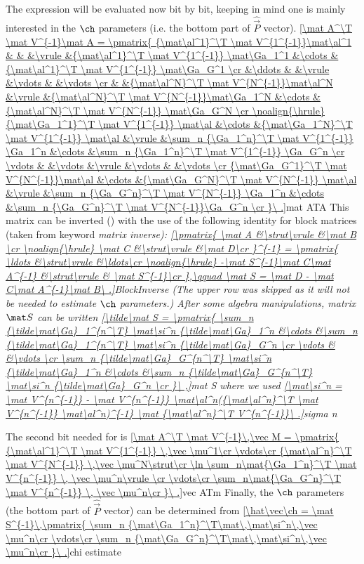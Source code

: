 The \rhs expression will be evaluated now bit by bit, keeping in mind one is mainly interested in the $\ch$ parameters (i.e. the bottom part of $\hat\vec P$ vector).
\eqref{\mat A^\T \mat V^{-1}\mat A = \pmatrix{
{\mat\al^1}^\T \mat V^{1^{-1}}\mat\al^1	&		&						&\vrule	&{\mat\al^1}^\T \mat V^{1^{-1}} \mat\Ga_1^1	&\cdots	&{\mat\al^1}^\T \mat V^{1^{-1}} \mat\Ga_G^1	\cr
					&\ddots	&						&\vrule	&\vdots					&		&\vdots					\cr
					&		&{\mat\al^N}^\T \mat V^{N^{-1}}\mat\al^N		&\vrule	&{\mat\al^N}^\T \mat V^{N^{-1}}\mat\Ga_1^N	&\cdots	&{\mat\al^N}^\T \mat V^{N^{-1}} \mat\Ga_G^N	\cr
\noalign{\hrule}
{\mat\Ga_1^1}^\T \mat V^{1^{-1}} \mat\al	&\cdots	&{\mat\Ga_1^N}^\T \mat V^{1^{-1}} \mat\al	&\vrule	&\sum_n {\Ga_1^n}^\T \mat V^{1^{-1}} \Ga_1^n	&\cdots	&\sum_n {\Ga_1^n}^\T \mat V^{1^{-1}} \Ga_G^n	\cr
\vdots				&		&\vdots					&\vrule	&\vdots					&		&\vdots					\cr
{\mat\Ga_G^1}^\T \mat V^{N^{-1}}\mat\al	&\cdots	&{\mat\Ga_G^N}^\T \mat V^{N^{-1}} \mat\al	&\vrule	&\sum_n {\Ga_G^n}^\T \mat V^{N^{-1}} \Ga_1^n	&\cdots	&\sum_n {\Ga_G^n}^\T \mat V^{N^{-1}}\Ga_G^n	\cr
}\ .}{mat ATA}
This matrix can be inverted () with the use of the following identity for block matrices (taken from  keyword \em{matrix inverse}): 
\eqref{\pmatrix{
\mat A	&\strut\vrule	&\mat B	\cr
\noalign{\hrule}
\mat C	&\strut\vrule	&\mat D\cr
}^{-1} = \pmatrix{
\ldots							&\strut\vrule	&\ldots\cr
\noalign{\hrule}
-\mat S^{-1}\mat C\mat A^{-1}	&\strut\vrule	& \mat S^{-1}\cr
},\qquad \mat S = \mat D - \mat C\mat A^{-1}\mat B\ .}{BlockInverse}
(The upper row was skipped as it will not be needed to estimate $\ch$ parameters.) After some algebra manipulations, matrix $\mat S$ can be written
\eqref{\tilde\mat S = \pmatrix{
\sum_n {\tilde\mat\Ga}_1^{n^\T} \mat\si^n {\tilde\mat\Ga}_1^n	&\cdots	&\sum_n {\tilde\mat\Ga}_1^{n^\T} \mat\si^n {\tilde\mat\Ga}_G^n	\cr
\vdots								&		&\vdots									\cr
\sum_n {\tilde\mat\Ga}_G^{n^\T} \mat\si^n {\tilde\mat\Ga}_1^n	&\cdots	&\sum_n {\tilde\mat\Ga}_G^{n^\T} \mat\si^n {\tilde\mat\Ga}_G^n	\cr
}\ ,}{mat S}
where we used
\eqref{\mat\si^n = \mat V^{n^{-1}} - \mat V^{n^{-1}} \mat\al^n({\mat\al^n}^\T \mat V^{n^{-1}} \mat\al^n)^{-1} \mat {\mat\al^n}^\T V^{n^{-1}}\ .}{sigma n}

The second bit needed for  is
\eqref{\mat A^\T \mat V^{-1}\,\vec M = \pmatrix{
{\mat\al^1}^\T \mat V^{1^{-1}} \,\vec \mu^1\cr
\vdots\cr
{\mat\al^n}^\T \mat V^{N^{-1}} \,\vec \mu^N\strut\cr
\ln
\sum_n\mat{\Ga_1^n}^\T \mat V^{n^{-1}} \, \vec \mu^n\vrule width0pt height15pt\cr
\vdots\cr
\sum_n\mat{\Ga_G^n}^\T \mat V^{n^{-1}} \, \vec \mu^n\cr
}\ .}{vec ATm}
Finally, the $\ch$ parameters (the bottom part of $\hat\vec P$ vector) can be determined from
\eqref{\hat\vec\ch = \mat S^{-1}\,\pmatrix{
\sum_n {\mat\Ga_1^n}^\T\mat\,\mat\si^n\,\vec \mu^n\cr
\vdots\cr
\sum_n {\mat\Ga_G^n}^\T\mat\,\mat\si^n\,\vec \mu^n\cr
}\ .}{chi estimate}

